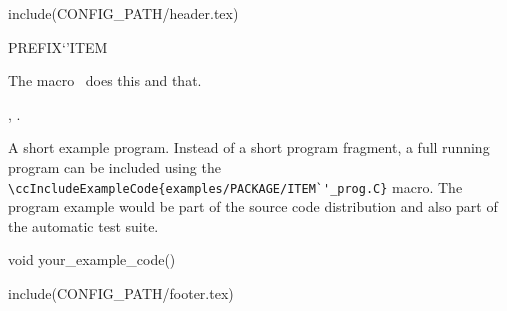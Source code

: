 include(CONFIG_PATH/header.tex)
\begin{ccRefMacro}{PREFIX`'ITEM}  %


\ccDefinition
  
The macro \ccRefName\ does this and that.



\ccIsModel


\ccSeeAlso

,
.

\ccExample

A short example program.
Instead of a short program fragment, a full running program can be
included using the 
\verb|\ccIncludeExampleCode{examples/PACKAGE/ITEM`'_prog.C}| 
macro. The program example would be part of the source code distribution and
also part of the automatic test suite.

\begin{ccExampleCode}
void your_example_code() {
}
\end{ccExampleCode}


\end{ccRefMacro}

include(CONFIG_PATH/footer.tex)
